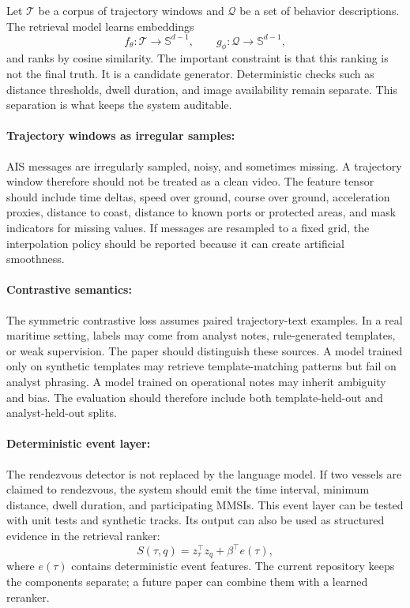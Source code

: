 \documentclass{article}
\begin{document}
Let $\mathcal{T}$ be a corpus of trajectory windows and $\mathcal{Q}$ be a set of behavior descriptions. The retrieval model learns embeddings
\begin{equation}
  f_{\theta}:\mathcal{T}\rightarrow\mathbb{S}^{d-1},\qquad
  g_{\phi}:\mathcal{Q}\rightarrow\mathbb{S}^{d-1},
\end{equation}
and ranks by cosine similarity. The important constraint is that this ranking is not the final truth. It is a candidate generator. Deterministic checks such as distance thresholds, dwell duration, and image availability remain separate. This separation is what keeps the system auditable.

\paragraph{Trajectory windows as irregular samples:}

AIS messages are irregularly sampled, noisy, and sometimes missing. A trajectory window therefore should not be treated as a clean video. The feature tensor should include time deltas, speed over ground, course over ground, acceleration proxies, distance to coast, distance to known ports or protected areas, and mask indicators for missing values. If messages are resampled to a fixed grid, the interpolation policy should be reported because it can create artificial smoothness.

\paragraph{Contrastive semantics:}

The symmetric contrastive loss assumes paired trajectory-text examples. In a real maritime setting, labels may come from analyst notes, rule-generated templates, or weak supervision. The paper should distinguish these sources. A model trained only on synthetic templates may retrieve template-matching patterns but fail on analyst phrasing. A model trained on operational notes may inherit ambiguity and bias. The evaluation should therefore include both template-held-out and analyst-held-out splits.

\paragraph{Deterministic event layer:}

The rendezvous detector is not replaced by the language model. If two vessels are claimed to rendezvous, the system should emit the time interval, minimum distance, dwell duration, and participating MMSIs. This event layer can be tested with unit tests and synthetic tracks. Its output can also be used as structured evidence in the retrieval ranker:
\begin{equation}
  S(\tau,q)=z_{\tau}^{\top}z_q+\beta^\top e(\tau),
\end{equation}
where $e(\tau)$ contains deterministic event features. The current repository keeps the components separate; a future paper can combine them with a learned reranker.
\end{document}
